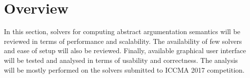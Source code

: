 \section{Overview}
In this section, solvers for computing abstract argumentation semantics will be reviewed in terms of performance and scalability. The availability of few solvers and ease of setup will also be reviewed. Finally, available graphical user interface will be tested and analysed in terms of usability and correctness. The analysis will be mostly performed on the solvers submitted to ICCMA 2017 competition.